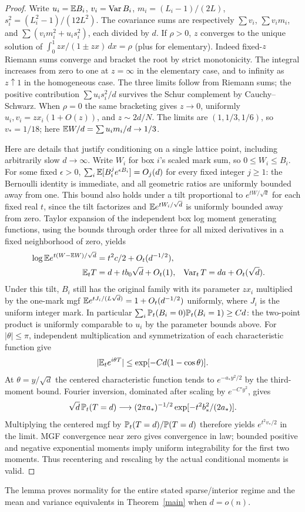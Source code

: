 \documentclass[11pt]{article}
\begin{document}
\begin{proof}
Write $u_i=\mathbb E B_i$, $v_i=\operatorname{Var} B_i$, $m_i=(L_i-1)/(2L)$, $s_i^2=(L_i^2-1)/(12L^2)$. The covariance sums are respectively $\sum v_i$, $\sum v_i m_i$, and $\sum(v_i m_i^2+u_i s_i^2)$, each divided by $d$. If $\rho>0$, $z$ converges to the unique solution of $\int_0^1 zx/(1\pm zx)\,dx=\rho$ (plus for elementary). Indeed fixed-$z$ Riemann sums converge and bracket the root by strict monotonicity. The integral increases from zero to one at $z=\infty$ in the elementary case, and to infinity as $z\uparrow1$ in the homogeneous case. The three limits follow from Riemann sums; the positive contribution $\sum u_i s_i^2/d$ survives the Schur complement by Cauchy--Schwarz. When $\rho=0$ the same bracketing gives $z\to0$, uniformly $u_i,v_i=zx_i(1+O(z))$, and $z\sim2d/N$. The limits are $(1,1/3,1/6)$, so $v_*=1/18$; here $\mathbb E W/d=\sum u_i m_i/d\to1/3$.
 
Here are details that justify conditioning on a single lattice point, including arbitrarily slow $d\to\infty$. Write $W_i$ for box $i$'s scaled mark sum, so $0\le W_i\le B_i$. For some fixed $\epsilon>0$, $\sum_i\mathbb E[B_i^j e^{\epsilon B_i}]=O_j(d)$ for every fixed integer $j\ge1$: the Bernoulli identity is immediate, and all geometric ratios are uniformly bounded away from one. This bound also holds under a tilt proportional to $e^{tW/\sqrt d}$ for each fixed real $t$, since the tilt factorizes and $\mathbb E e^{tW_i/\sqrt d}$ is uniformly bounded away from zero. Taylor expansion of the independent box log moment generating functions, using the bounds through order three for all mixed derivatives in a fixed neighborhood of zero, yields
\begin{align*}
\log \mathbb E e^{t(W-\mathbb E W)/\sqrt d}&=t^2 c/2+O_t(d^{-1/2}),\\
\mathbb E_t T&=d+t b_0\sqrt d+O_t(1),&
\operatorname{Var}_t T&=da+O_t(\sqrt d).
\end{align*}
Under this tilt, $B_i$ still has the original family with its parameter $zx_i$ multiplied by the one-mark mgf $\mathbb E e^{tJ_i/(L\sqrt d)}=1+O_t(d^{-1/2})$ uniformly, where $J_i$ is the uniform integer mark. In particular $\sum_i \mathbb P_t(B_i=0)\mathbb P_t(B_i=1)\ge C d$: the two-point product is uniformly comparable to $u_i$ by the parameter bounds above. For $|\theta|\le\pi$, independent multiplication and symmetrization of each characteristic function give
\[
|\mathbb E_t e^{i\theta T}|\le \exp[-C d(1-\cos\theta)] .
\]
At $\theta=y/\sqrt d$ the centered characteristic function tends to $e^{-a_* y^2/2}$ by the third-moment bound. Fourier inversion, dominated after scaling by $e^{-C' y^2}$, gives
\[
\sqrt d\,\mathbb P_t(T=d)\longrightarrow(2\pi a_*)^{-1/2}
\exp[-t^2 b_*^2/(2a_*)] .
\]
Multiplying the centered mgf by $\mathbb P_t(T=d)/\mathbb P(T=d)$ therefore yields $e^{t^2 v_*/2}$ in the limit. MGF convergence near zero gives convergence in law; bounded positive and negative exponential moments imply uniform integrability for the first two moments. Thus recentering and rescaling by the actual conditional moments is valid.
\end{proof}
The lemma proves normality for the entire stated sparse/interior regime and the mean and variance equivalents in Theorem~\ref{main} when $d=o(n)$.
\end{document}
